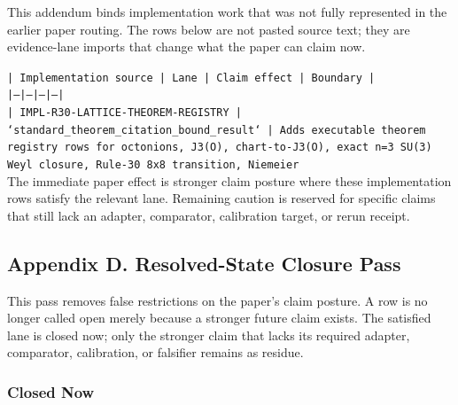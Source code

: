 \documentclass[11pt]{article}
\begin{document}
This addendum binds implementation work that was not fully represented in the earlier paper routing. The rows below are not pasted source text; they are evidence-lane imports that change what the paper can claim now.

\noindent\texttt{| Implementation source | Lane | Claim effect | Boundary |}\\
\noindent\texttt{|---|---|---|---|}\\
\noindent\texttt{| IMPL-R30-LATTICE-THEOREM-REGISTRY | `standard\_theorem\_citation\_bound\_result` | Adds executable theorem registry rows for octonions, J3(O), chart-to-J3(O), exact n=3 SU(3) Weyl closure, Rule-30 8x8 transition, Niemeier }\\

The immediate paper effect is stronger claim posture where these implementation rows satisfy the relevant lane. Remaining caution is reserved for specific claims that still lack an adapter, comparator, calibration target, or rerun receipt.

\subsection*{Appendix D. Resolved-State Closure Pass}

This pass removes false restrictions on the paper's claim posture. A row is no longer called open merely because a stronger future claim exists. The satisfied lane is closed now; only the stronger claim that lacks its required adapter, comparator, calibration, or falsifier remains as residue.

\subsubsection*{Closed Now}
\end{document}
